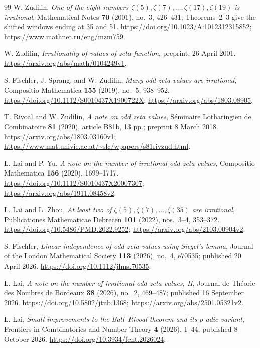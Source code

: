 \documentclass[11pt,letterpaper]{article}
\theoremstyle{definition}
\begin{document}
\begin{thebibliography}{99}
W. Zudilin, \emph{One of the eight numbers
$\zeta(5),\zeta(7),\ldots,\zeta(17),\zeta(19)$ is irrational},
Mathematical Notes \textbf{70} (2001), no.~3, 426--431; Theorems~2--3
give the shifted windows ending at 35 and 51.
\url{https://doi.org/10.1023/A:1012312315852};
\url{https://www.mathnet.ru/eng/mzm759}.

W. Zudilin, \emph{Irrationality of values of zeta-function},
preprint, 26 April 2001. \url{https://arxiv.org/abs/math/0104249v1}.

S. Fischler, J. Sprang, and W. Zudilin, \emph{Many odd zeta values are
irrational}, Compositio Mathematica \textbf{155} (2019), no.~5, 938--952.
\url{https://doi.org/10.1112/S0010437X1900722X};
\url{https://arxiv.org/abs/1803.08905}.

T. Rivoal and W. Zudilin, \emph{A note on odd zeta values}, S\'eminaire
Lotharingien de Combinatoire \textbf{81} (2020), article B81b, 13 pp.;
preprint 8 March 2018. \url{https://arxiv.org/abs/1803.03160v1};
\url{https://www.mat.univie.ac.at/~slc/wpapers/s81rivzud.html}.

L. Lai and P. Yu, \emph{A note on the number of irrational odd zeta
values}, Compositio Mathematica \textbf{156} (2020), 1699--1717.
\url{https://doi.org/10.1112/S0010437X20007307};
\url{https://arxiv.org/abs/1911.08458v2}.

L. Lai and L. Zhou, \emph{At least two of
$\zeta(5),\zeta(7),\ldots,\zeta(35)$ are irrational},
Publicationes Mathematicae Debrecen \textbf{101} (2022), nos.~3--4,
353--372. \url{https://doi.org/10.5486/PMD.2022.9252};
\url{https://arxiv.org/abs/2103.00904v2}.

S. Fischler, \emph{Linear independence of odd zeta values using
Siegel's lemma}, Journal of the London Mathematical Society
\textbf{113} (2026), no.~4, e70535; published 20 April 2026.
\url{https://doi.org/10.1112/jlms.70535}.

L. Lai, \emph{A note on the number of irrational odd zeta values, II}, Journal
de Th\'eorie des Nombres de Bordeaux \textbf{38} (2026), no.~2,
469--487; published 16 September 2026.
\url{https://doi.org/10.5802/jtnb.1368};
\url{https://arxiv.org/abs/2501.05321v2}.

L. Lai, \emph{Small improvements to the Ball--Rivoal theorem and its
$p$-adic variant}, Frontiers in Combinatorics and Number Theory
\textbf{4} (2026), 1--44; published 8 October 2026.
\url{https://doi.org/10.3934/fcnt.2026024}.


\end{thebibliography}
\end{document}
